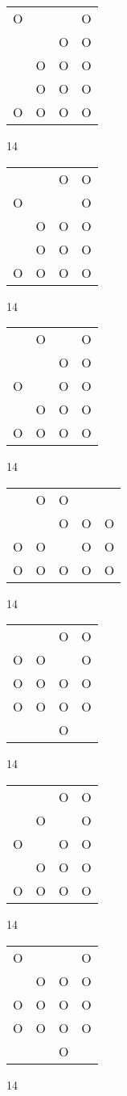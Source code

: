 \begin{tabular}{|m{0.2cm}m{0.2cm}m{0.2cm}m{0.2cm}|}\hline
O& & &O\\
 & &O&O\\
 &O&O&O\\
 &O&O&O\\
O&O&O&O\\
\hline\end{tabular}14
\begin{tabular}{|m{0.2cm}m{0.2cm}m{0.2cm}m{0.2cm}|}\hline
 & &O&O\\
O& & &O\\
 &O&O&O\\
 &O&O&O\\
O&O&O&O\\
\hline\end{tabular}14
\begin{tabular}{|m{0.2cm}m{0.2cm}m{0.2cm}m{0.2cm}|}\hline
 &O& &O\\
 & &O&O\\
O& &O&O\\
 &O&O&O\\
O&O&O&O\\
\hline\end{tabular}14
\begin{tabular}{|m{0.2cm}m{0.2cm}m{0.2cm}m{0.2cm}m{0.2cm}|}\hline
 &O&O& & \\
 & &O&O&O\\
O&O& &O&O\\
O&O&O&O&O\\
\hline\end{tabular}14
\begin{tabular}{|m{0.2cm}m{0.2cm}m{0.2cm}m{0.2cm}|}\hline
 & &O&O\\
O&O& &O\\
O&O&O&O\\
O&O&O&O\\
 & &O& \\
\hline\end{tabular}14
\begin{tabular}{|m{0.2cm}m{0.2cm}m{0.2cm}m{0.2cm}|}\hline
 & &O&O\\
 &O& &O\\
O& &O&O\\
 &O&O&O\\
O&O&O&O\\
\hline\end{tabular}14
\begin{tabular}{|m{0.2cm}m{0.2cm}m{0.2cm}m{0.2cm}|}\hline
O& & &O\\
 &O&O&O\\
O&O&O&O\\
O&O&O&O\\
 & &O& \\
\hline\end{tabular}14

